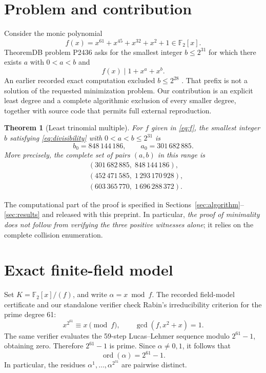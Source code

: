 \documentclass[11pt,a4paper]{article}
\newtheorem{theorem}{Theorem}
\newcommand{\F}{\mathbb F}
\newcommand{\poly}{x^{61}+x^{45}+x^{32}+x^2+1}
\newcommand{\Bmax}{2^{31}}
\begin{document}
\section{Problem and contribution}
Consider the monic polynomial
\begin{equation}\label{eq:f}
 f(x)=\poly\in\F_2[x].
\end{equation}
TheoremDB problem P2436 asks for the smallest integer \(b\le\Bmax\)
for which there exists \(a\) with \(0<a<b\) and
\begin{equation}\label{eq:divisibility}
 f(x)\mid 1+x^a+x^b.
\end{equation}
An earlier recorded exact computation excluded \(b\le 2^{28}\)
\cite{theoremdb}. That prefix is not a solution of the requested minimization
problem. Our contribution is an explicit least degree and a complete
algorithmic exclusion of every smaller degree, together with source code
that permits full external reproduction.

\begin{theorem}[Least trinomial multiple]\label{thm:main}
For \(f\) given in \eqref{eq:f}, the smallest integer \(b\) satisfying
\eqref{eq:divisibility} with \(0<a<b\le 2^{31}\) is
\[
 \boxed{b_0=848\,144\,186,\qquad a_0=301\,682\,885.}
\]
More precisely, the complete set of pairs \((a,b)\) in this range is
\begin{align*}
 &(301\,682\,885,\;848\,144\,186),\\
 &(452\,471\,585,\;1\,293\,170\,928),\\
 &(603\,365\,770,\;1\,696\,288\,372).
\end{align*}
\end{theorem}
The computational part of the proof is specified in
Sections~\ref{sec:algorithm}--\ref{sec:results} and released with this
preprint. In particular, \emph{the proof of minimality does not follow from
verifying the three positive witnesses alone}; it relies on the complete
collision enumeration.

\section{Exact finite-field model}
Set \(K=\F_2[x]/(f)\), and write \(\alpha=x\bmod f\). The recorded
field-model certificate and our standalone verifier check Rabin's
irreducibility criterion for the prime degree 61:
\begin{equation}\label{eq:rabin}
 x^{2^{61}}\equiv x\pmod f,\qquad
 \gcd(f,x^2+x)=1.
\end{equation}
The same verifier evaluates the 59-step Lucas--Lehmer sequence modulo
\(2^{61}-1\), obtaining zero. Therefore \(2^{61}-1\) is prime. Since
\(\alpha\ne0,1\), it follows that
\begin{equation}\label{eq:order}
 \operatorname{ord}(\alpha)=2^{61}-1.
\end{equation}
In particular, the residues \(\alpha^1,\ldots,\alpha^{2^{31}}\)
are pairwise distinct.
\end{document}
